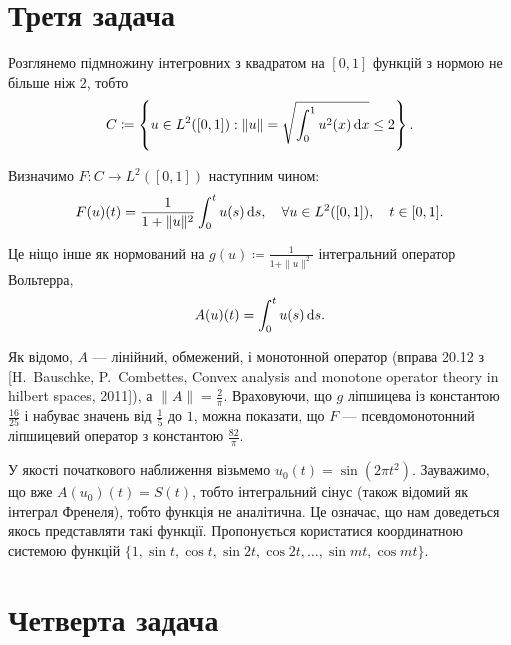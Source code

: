 \section{Третя задача}

Розглянемо підмножину інтегровних з квадратом на $[0,1]$ функцій з нормою не більше ніж $2$, тобто
\begin{equation}
    C \coloneqq \left\{ u \in L^2([0, 1]) : \|u\| = \sqrt{\int_0^1 u^2(x) \mathop{}\!\mathrm{d} x} \le 2 \right\}.
\end{equation}

Визначимо $F: C \to L^2([0, 1])$ наступним чином:
\begin{equation}
    F(u)(t) = \frac{1}{1 + \|u\|^2} \int_0^t u(s) \mathop{}\!\mathrm{d} s, \quad \forall u \in L^2([0, 1]), \quad t \in [0, 1].
\end{equation}

Це ніщо інше як нормований на $g(u) \coloneqq \frac{1}{1 + \|u\|^2}$ інтегральний оператор Вольтерра, 
\begin{equation}
    A(u)(t) = \int_0^t u(s) \mathop{}\!\mathrm{d} s.
\end{equation}

Як відомо, $A$ --- лінійний, обмежений, і монотонной оператор (вправа 20.12 з [H.~Bauschke, P.~Combettes, Convex analysis and monotone operator theory in hilbert spaces, 2011]), а $\|A\| = \frac{2}{\pi}$. Враховуючи, що $g$ ліпшицева із константою $\frac{16}{25}$ і набуває значень від $\frac{1}{5}$ до $1$, можна показати, що $F$ --- псевдомонотонний ліпшицевий оператор з константою $\frac{82}{\pi}$. \medskip

У якості початкового наближення візьмемо $u_0(t) = \sin (2 \pi t^2)$. Зауважимо, що вже $A(u_0)(t) = S(t)$, тобто інтегральний сінус (також відомий як інтеграл Френеля), тобто функція не аналітична. Це означає, що нам доведеться якось представляти такі функції. Пропонується користатися координатною системою функцій $\{1, \sin t, \cos t, \sin 2 t, \cos 2 t, \dots, \sin mt, \cos mt\}$. 

\section{Четверта задача}

